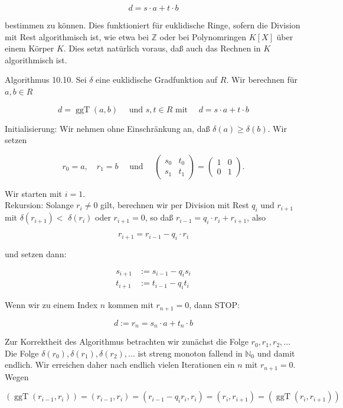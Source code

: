 \documentclass[10pt, letterpaper]{article}
\begin{document}
$$
d=s \cdot a+t \cdot b
$$

bestimmen zu können. Dies funktioniert für euklidische Ringe, sofern die Division mit Rest algorithmisch ist, wie etwa bei $\mathbb{Z}$ oder bei Polynomringen $K[X]$ über einem Körper $K$. Dies setzt natürlich voraus, daß auch das Rechnen in $K$ algorithmisch ist.

Algorithmus 10.10. Sei $\delta$ eine euklidische Gradfunktion auf $R$. Wir berechnen für $a, b \in R$

$$
d=\operatorname{ggT}(a, b) \quad \text { und } s, t \in R \text { mit } \quad d=s \cdot a+t \cdot b
$$

Initialisierung: Wir nehmen ohne Einschränkung an, daß $\delta(a) \geq \delta(b)$. Wir setzen

$$
r_{0}=a, \quad r_{1}=b \quad \text { und } \quad\left(\begin{array}{cc}
s_{0} & t_{0} \\
s_{1} & t_{1}
\end{array}\right)=\left(\begin{array}{cc}
1 & 0 \\
0 & 1
\end{array}\right) .
$$

Wir starten mit $i=1$.\\
Rekursion: Solange $r_{i} \neq 0$ gilt, berechnen wir per Division mit Rest $q_{i}$ und $r_{i+1}$ mit $\delta\left(r_{i+1}\right)<$ $\delta\left(r_{i}\right)$ oder $r_{i+1}=0$, so daß $r_{i-1}=q_{i} \cdot r_{i}+r_{i+1}$, also

$$
r_{i+1}=r_{i-1}-q_{i} \cdot r_{i}
$$

und setzen dann:

$$
\begin{aligned}
s_{i+1} & :=s_{i-1}-q_{i} s_{i} \\
t_{i+1} & :=t_{i-1}-q_{i} t_{i}
\end{aligned}
$$

Wenn wir zu einem Index $n$ kommen mit $r_{n+1}=0$, dann STOP:

$$
d:=r_{n}=s_{n} \cdot a+t_{n} \cdot b
$$

Zur Korrektheit des Algorithmus betrachten wir zunächst die Folge $r_{0}, r_{1}, r_{2}, \ldots$ Die Folge $\delta\left(r_{0}\right), \delta\left(r_{1}\right), \delta\left(r_{2}\right), \ldots$ ist streng monoton fallend in $\mathbb{N}_{0}$ und damit endlich. Wir erreichen daher nach endlich vielen Iterationen ein $n$ mit $r_{n+1}=0$. Wegen

$$
\left(\operatorname{ggT}\left(r_{i-1}, r_{i}\right)\right)=\left(r_{i-1}, r_{i}\right)=\left(r_{i-1}-q_{i} r_{i}, r_{i}\right)=\left(r_{i}, r_{i+1}\right)=\left(\operatorname{ggT}\left(r_{i}, r_{i+1}\right)\right)
$$
\end{document}
